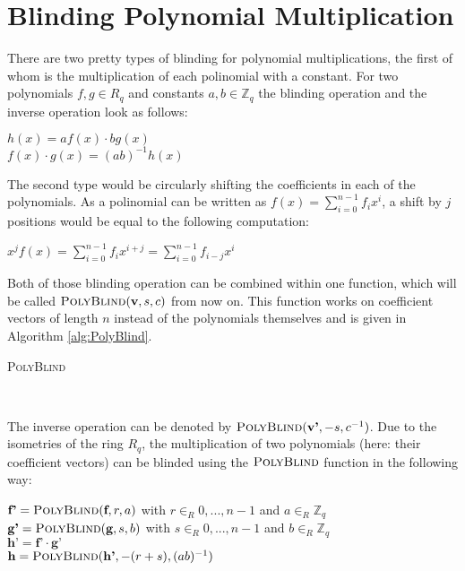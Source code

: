 \section{Blinding Polynomial Multiplication}
There are two pretty types of blinding for polynomial multiplications, the first of whom is the multiplication of each polinomial with a constant. For two polynomials \(f,g \in R_q\) and constants \(a,b \in \mathbb{Z}_q\) the blinding operation and the inverse operation look as follows:
\begin{center}
	\(h(x) = a f(x) \cdot b g(x)\)\\
	\(f(x) \cdot g(x) = (ab)^{-1} h(x)\)
\end{center}
The second type would be circularly shifting the coefficients in each of the polynomials. As a polinomial can be written as \(f(x) = \sum_{i=0}^{n-1} f_i x^i\), a shift by \(j\) positions would be equal to the following computation:
\begin{center}
	\(x^j f(x) = \sum_{i=0}^{n-1} f_i x^{i+j} = \sum_{i=0}^{n-1} f_{i-j} x^i \)
\end{center}
Both of those blinding operation can be combined within one function, which will be called \(\textsc{PolyBlind}(\textbf{v},s,c)\) from now on. This function works on coefficient vectors of length \(n\) instead of the polynomials themselves and is given in Algorithm \ref{alg:PolyBlind}.\newline
\begin{algorithm}
    \caption{\textsc{PolyBlind}}
    \label{alg:PolyBlind}
    \begin{algorithmic}[1]
        \EndFor
        \EndFor\\
    \end{algorithmic}
\end{algorithm}
The inverse operation can be denoted by \(\textsc{PolyBlind}(\textbf{v'},-s,c^{-1})\). Due to the isometries of the ring \(R_q\), the multiplication of two polynomials (here: their coefficient vectors) can be blinded using the \(\textsc{PolyBlind}\) function in the following way:
\begin{center}
	\(\textbf{f'} = \textsc{PolyBlind}(\textbf{f},r,a)\) with \(r \in_R {0,...,n-1}\) and \(a \in_R \mathbb{Z}_q\)\\
	\(\textbf{g'} = \textsc{PolyBlind}(\textbf{g},s,b)\) with \(s \in_R {0,...,n-1}\) and \(b \in_R \mathbb{Z}_q\)\\
	\(\textbf{h'} = \textbf{f'} \cdot \textbf{g'}\)\\
	\(\textbf{h} = \textsc{PolyBlind}(\textbf{h'},-(r+s),(ab)^{-1})\)
\end{center}

